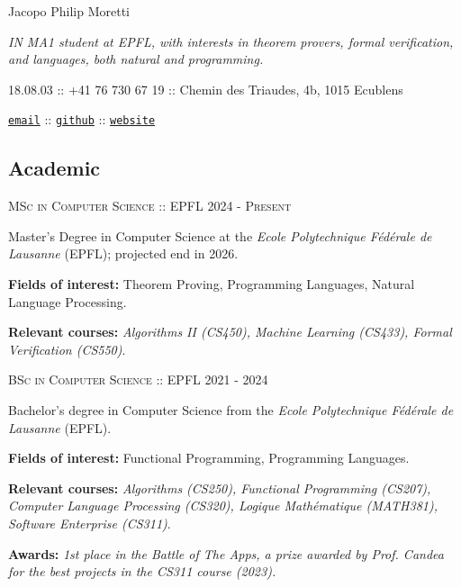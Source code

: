 \documentclass[11pt]{article}
\renewcommand{\url}[1]{{\texttt{#1}}}
\renewcommand{\line}[2]{{\vspace{4pt} \large \noindent\textsc{#1} \hfill \small{#2}}\vspace{0pt}}
\begin{document}
  \setlength{\parindent}{0em}
  \pagestyle{empty}

  \begin{center}
    \begin{minipage}[C]{0.66\textwidth}
      \begin{center}
        \huge Jacopo Philip Moretti
      \end{center}
      \textit{IN MA1 student at EPFL, with interests in theorem provers, formal verification, and languages, both natural and programming.}

      18.08.03 :: +41 76 730 67 19 :: Chemin des Triaudes, 4b, 1015 Ecublens
      \vspace{-0.75em}
      \begin{center}
        \href{https://people.epfl.ch/jacopo.moretti}{\url{email}} :: \href{https://github.com/quartztz}{\url{github}} :: \href{https://quartztz.github.io}{\url{website}}
      \end{center}
    \end{minipage}
  \end{center}

  \subsection*{Academic}

  \line{MSc in Computer Science :: EPFL}{2024 - \textsc{Present}}

  Master's Degree in Computer Science at the \textit{Ecole Polytechnique Fédérale de Lausanne} (EPFL); projected end in 2026.

  \textbf{Fields of interest:} Theorem Proving, Programming Languages, Natural Language Processing.

  \textbf{Relevant courses:} \textit{Algorithms II (CS450), Machine Learning (CS433), Formal Verification (CS550)}.

  \vspace{0.75em}
  \line{BSc in Computer Science :: EPFL}{2021 - 2024}

  Bachelor's degree in Computer Science from the \textit{Ecole Polytechnique Fédérale de Lausanne} (EPFL).

  \textbf{Fields of interest:} Functional Programming, Programming Languages.

  \textbf{Relevant courses:} \textit{Algorithms (CS250), Functional Programming (CS207), Computer Language Processing (CS320), Logique Mathématique (MATH381), Software Enterprise (CS311)}.

\textbf{Awards:} \textit{1st place in the Battle of The Apps, a prize awarded by Prof. Candea for the best projects in the CS311 course (2023).}
\end{document}
